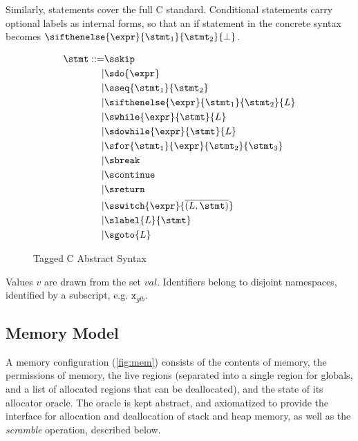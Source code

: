 \documentclass{article}
\begin{document}
Similarly, statements cover the full C standard. Conditional statements
carry optional labels as internal forms, so that an if statement in the
concrete syntax becomes \(\sifthenelse{\expr}{\stmt_1}{\stmt_2}{\bot}\).

\begin{figure}
  \begin{subfigure}[t]{0.3\textwidth}
    \[\begin{aligned}
    \stmt ::= & \sskip \\
    | & \sdo{\expr} \\
    | & \sseq{\stmt_1}{\stmt_2} \\
    | & \sifthenelse{\expr}{\stmt_1}{\stmt_2}{L} \\
    | & \swhile{\expr}{\stmt}{L} \\
    | & \sdowhile{\expr}{\stmt}{L} \\
    | & \sfor{\stmt_1}{\expr}{\stmt_2}{\stmt_3} \\
    | & \sbreak \\
    | & \scontinue \\
    | & \sreturn \\
    | & \sswitch{\expr}{\overline{(L,\stmt)}} \\
    | & \slabel{L}{\stmt} \\
    | & \sgoto{L} \\    
    \end{aligned}\]
  \end{subfigure}
  \begin{subfigure}[t]{0.69\textwidth}
  \end{subfigure}
  \caption{Tagged C Abstract Syntax}
  \label{fig:syntax}
\end{figure}

Values \(v\) are drawn from the set \(\mathit{val}\). Identifiers belong to
disjoint namespaces, identified by a subscript, e.g. \(\mathtt{x}_{glb}\).

\subsection{Memory Model}

A memory configuration (\cref{fig:mem}) consists of the contents of memory, the permissions
of memory, the live regions (separated into a single region for globals, and
a list of allocated regions that can be deallocated), and the state of its
allocator oracle. The oracle is kept abstract, and axiomatized to provide the
interface for allocation and deallocation of stack and heap memory, as well as
the {\it scramble} operation, described below.
\end{document}
